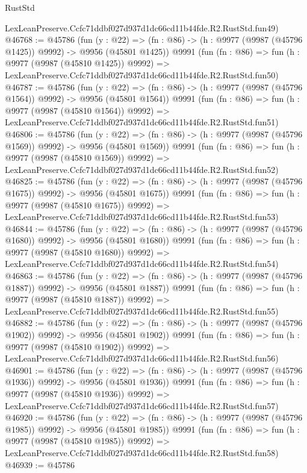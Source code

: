 \begin{lexlean}{RustStd}
\begin{coremodule}
    LexLeanPreserve.Ccfc71ddbf027d937d1dc66cd11b44fde.R2.RustStd.fun49)
@46768 := @45786
    (fun (y : @22) =>
    (fn : @86) -> (h : @9977 (@9987 (@45796 @1425)) @9992) -> @9956 (@45801 @1425))
    @9991
    (fun (fn : @86) =>
    fun (h : @9977 (@9987 (@45810 @1425)) @9992) =>
    LexLeanPreserve.Ccfc71ddbf027d937d1dc66cd11b44fde.R2.RustStd.fun50)
@46787 := @45786
    (fun (y : @22) =>
    (fn : @86) -> (h : @9977 (@9987 (@45796 @1564)) @9992) -> @9956 (@45801 @1564))
    @9991
    (fun (fn : @86) =>
    fun (h : @9977 (@9987 (@45810 @1564)) @9992) =>
    LexLeanPreserve.Ccfc71ddbf027d937d1dc66cd11b44fde.R2.RustStd.fun51)
@46806 := @45786
    (fun (y : @22) =>
    (fn : @86) -> (h : @9977 (@9987 (@45796 @1569)) @9992) -> @9956 (@45801 @1569))
    @9991
    (fun (fn : @86) =>
    fun (h : @9977 (@9987 (@45810 @1569)) @9992) =>
    LexLeanPreserve.Ccfc71ddbf027d937d1dc66cd11b44fde.R2.RustStd.fun52)
@46825 := @45786
    (fun (y : @22) =>
    (fn : @86) -> (h : @9977 (@9987 (@45796 @1675)) @9992) -> @9956 (@45801 @1675))
    @9991
    (fun (fn : @86) =>
    fun (h : @9977 (@9987 (@45810 @1675)) @9992) =>
    LexLeanPreserve.Ccfc71ddbf027d937d1dc66cd11b44fde.R2.RustStd.fun53)
@46844 := @45786
    (fun (y : @22) =>
    (fn : @86) -> (h : @9977 (@9987 (@45796 @1680)) @9992) -> @9956 (@45801 @1680))
    @9991
    (fun (fn : @86) =>
    fun (h : @9977 (@9987 (@45810 @1680)) @9992) =>
    LexLeanPreserve.Ccfc71ddbf027d937d1dc66cd11b44fde.R2.RustStd.fun54)
@46863 := @45786
    (fun (y : @22) =>
    (fn : @86) -> (h : @9977 (@9987 (@45796 @1887)) @9992) -> @9956 (@45801 @1887))
    @9991
    (fun (fn : @86) =>
    fun (h : @9977 (@9987 (@45810 @1887)) @9992) =>
    LexLeanPreserve.Ccfc71ddbf027d937d1dc66cd11b44fde.R2.RustStd.fun55)
@46882 := @45786
    (fun (y : @22) =>
    (fn : @86) -> (h : @9977 (@9987 (@45796 @1902)) @9992) -> @9956 (@45801 @1902))
    @9991
    (fun (fn : @86) =>
    fun (h : @9977 (@9987 (@45810 @1902)) @9992) =>
    LexLeanPreserve.Ccfc71ddbf027d937d1dc66cd11b44fde.R2.RustStd.fun56)
@46901 := @45786
    (fun (y : @22) =>
    (fn : @86) -> (h : @9977 (@9987 (@45796 @1936)) @9992) -> @9956 (@45801 @1936))
    @9991
    (fun (fn : @86) =>
    fun (h : @9977 (@9987 (@45810 @1936)) @9992) =>
    LexLeanPreserve.Ccfc71ddbf027d937d1dc66cd11b44fde.R2.RustStd.fun57)
@46920 := @45786
    (fun (y : @22) =>
    (fn : @86) -> (h : @9977 (@9987 (@45796 @1985)) @9992) -> @9956 (@45801 @1985))
    @9991
    (fun (fn : @86) =>
    fun (h : @9977 (@9987 (@45810 @1985)) @9992) =>
    LexLeanPreserve.Ccfc71ddbf027d937d1dc66cd11b44fde.R2.RustStd.fun58)
@46939 := @45786

\end{coremodule}
\end{lexlean}

